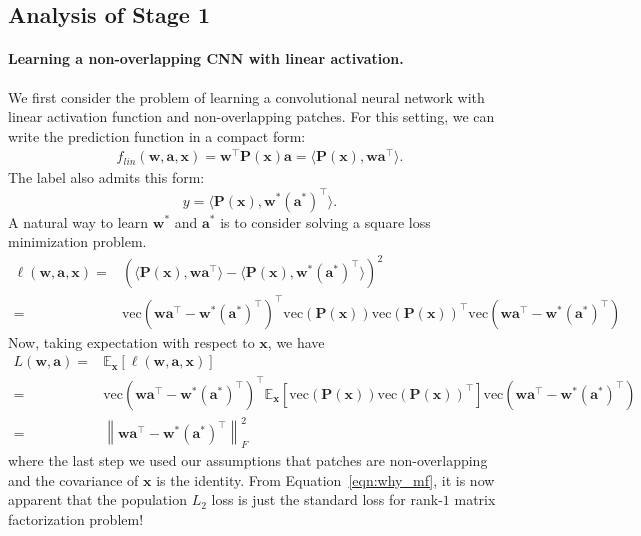 \documentclass[11pt]{article}
\newcommand{\mat}[1]{\mathbf{#1}}
\newcommand{\vect}[1]{\mathbf{#1}}
\newcommand{\norm}[1]{\left\|#1\right\|}
\newcommand{\expect}{\mathbb{E}}
\newcommand{\vectorize}[1]{\text{vec}\left(#1\right)}
\begin{document}
\subsection{Analysis of Stage 1}\label{sec:stage1_analysis}\paragraph{Learning a non-overlapping CNN with linear activation.}
We first consider the problem of learning a convolutional neural network with linear activation function and non-overlapping patches.
For this setting, we can write the prediction function in a compact form:\begin{align*}
	f_{lin}\left(\vect{w},\vect{a},\vect{x}\right) = \vect{w}^\top \mat{P}\left(\vect{x}\right)\vect{a} = \langle \mat{P}\left(\vect{x}\right),\vect{w}\vect{a}^\top \rangle.
\end{align*}
The label also admits this form:\[
y = \langle \mat{P}\left(\vect{x}\right),\vect{w}^*\left(\vect{a}^*\right)^\top \rangle.
\]
A natural way to learn $\vect{w}^*$ and $\vect{a}^*$ is to consider solving a square loss minimization problem.
\begin{align*}
 \ell\left(\vect{w},\vect{a},\vect{x}\right)= &\left(\langle \mat{P}\left(\vect{x}\right),\vect{w}\vect{a}^\top \rangle- \langle \mat{P}\left(\vect{x}\right),\vect{w}^*\left(\vect{a}^*\right)^\top \rangle\right)^2 \\
	= &\vectorize{\vect{w}\vect{a}^\top - \vect{w}^*\left(\vect{a}^*\right)^\top}^\top  \vectorize{\mat{P}\left(\vect{x}\right)}\vectorize{\mat{P}\left(\vect{x}\right)}^\top \vectorize{\vect{w}\vect{a}^\top - \vect{w}^*\left(\vect{a}^*\right)^\top}
\end{align*}
Now, taking expectation with respect to $\vect{x}$, we have \begin{align}
	L\left(\vect{w},\vect{a}\right) = &\expect_{\vect{x}} \left[\ell\left(\vect{w},\vect{a},\vect{x}\right)\right]  \nonumber\\
	= & \vectorize{\vect{w}\vect{a}^\top - \vect{w}^*\left(\vect{a}^*\right)^\top}^\top  \expect_{\vect{x}}\left[\vectorize{\mat{P}\left(\vect{x}\right)}\vectorize{\mat{P}\left(\vect{x}\right)}^\top \right]\vectorize{\vect{w}\vect{a}^\top - \vect{w}^*\left(\vect{a}^*\right)^\top} \nonumber\\
	= &\norm{\vect{w}\vect{a}^\top - \vect{w}^*\left(\vect{a}^*\right)^\top}_F^2 \label{eqn:why_mf}
\end{align}
where the last step we used our assumptions that patches are non-overlapping and the covariance of $\vect{x}$ is the identity.
From Equation~\eqref{eqn:why_mf}, it is now apparent that the population $L_2$ loss is just the standard loss for rank-$1$ matrix factorization problem!
\end{document}
